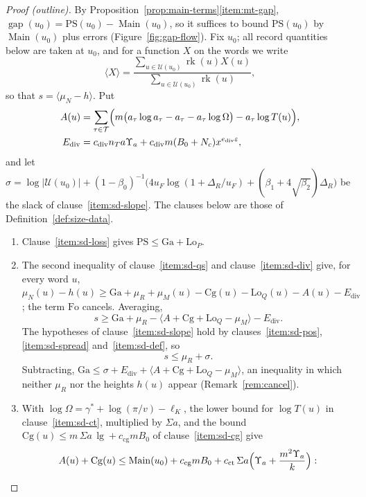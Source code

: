 \documentclass[11pt]{amsbook}
\theoremstyle{plain}
\theoremstyle{definition}
\theoremstyle{remark}
\numberwithin{equation}{section}
\numberwithin{figure}{chapter}
\numberwithin{table}{chapter}
\newcommand{\eps}{\varepsilon}
\newcommand{\rk}{\operatorname{rk}}
\newcommand{\PS}{\mathrm{PS}}
\newcommand{\Top}{\mathcal{T}}
\newcommand{\gap}{\operatorname{gap}}
\newcommand{\Main}{\operatorname{Main}}
\newcommand{\Words}{\mathcal{U}}
\newcommand{\Cg}{\mathrm{Cg}}
\newcommand{\lgv}{\operatorname{lg}}
\newcommand{\Fo}{\mathrm{Fo}}
\newcommand{\Ga}{\mathrm{Ga}}
\newcommand{\Lo}{\mathrm{Lo}}
\begin{document}
\begin{proof}[Proof (outline)]
By Proposition~\ref{prop:main-terms}\ref{item:mt-gap},
$\gap(u_0)=\PS(u_0)-\Main(u_0)$,
so it suffices to bound $\PS(u_0)$ by $\Main(u_0)$ plus errors (Figure~\ref{fig:gap-flow}). Fix
$u_0$; all record quantities below are taken at $u_0$, and for a
function $X$ on the words we write
\[
\langle X\rangle=\frac{\sum_{u\in\Words(u_0)}\rk(u)X(u)}
{\sum_{u\in\Words(u_0)}\rk(u)},
\]
so that $s=\langle\mu_N-h\rangle$. Put
\[
\begin{aligned}
A(u)&=\sum_{\tau\in\Top}\Bigl(m\bigl(a_\tau\log a_\tau
-a_\tau-a_\tau\log\Omega\bigr)-a_\tau\log T(u)\Bigr),\\
E_{\mathrm{div}}&=c_{\mathrm{div}}n_Ta\Upsilon_a+c_{\mathrm{div}}
m(B_0+N_c)x^{e_{\mathrm{div}}\eps},
\end{aligned}
\]
and let $\sigma=\log|\Words(u_0)|+(1-\beta_0)^{-1}\bigl(4u_F\log(1+
\Delta_R/u_F)+(\beta_1+4\sqrt{\beta_2})\Delta_R\bigr)$ be the slack of
clause~\ref{item:sd-slope}. The clauses below are those of
Definition~\ref{def:size-data}.
\begin{enumerate}[label=(\arabic*)]
\item\label{item:gap-s1} Clause~\ref{item:sd-loss} gives $\PS\le\Ga+\Lo_P$.
\item The second inequality of clause~\ref{item:sd-qs} and
clause~\ref{item:sd-div} give, for
every word $u$,
$\mu_N(u)-h(u)\ge\Ga+\mu_R+\mu_M(u)-\Cg(u)-\Lo_Q(u)-A(u)
-E_{\mathrm{div}}$; the term $\Fo$ cancels. Averaging,
\begin{equation}\label{eq:sandwich-lower}
s\ge\Ga+\mu_R-\bigl\langle A+\Cg+\Lo_Q-\mu_M\bigr\rangle
-E_{\mathrm{div}}.
\end{equation}
The hypotheses of clause~\ref{item:sd-slope} hold by clauses~\ref{item:sd-pos},
\ref{item:sd-spread} and~\ref{item:sd-def}, so
\begin{equation}\label{eq:sandwich-upper}
s\le\mu_R+\sigma.
\end{equation}
Subtracting, $\Ga\le\sigma+E_{\mathrm{div}}+\langle A+\Cg+\Lo_Q
-\mu_M\rangle$, an inequality in which neither $\mu_R$ nor the
heights $h(u)$ appear (Remark~\ref{rem:cancel}).
\item\label{item:gap-s3}
With $\log\Omega=\gamma^*+\log(\pi/v)-\ell_K$, the lower bound
for $\log T(u)$ in clause~\ref{item:sd-ct}, multiplied by $\Sigma a$, and the
bound
$\Cg(u)\le m\,\Sigma a\,\lgv+c_{\mathrm{cg}}mB_0$ of clause~\ref{item:sd-cg}
give
\[
A(u)+\Cg(u)\le\Main(u_0)+c_{\mathrm{cg}}mB_0+c_{\mathrm{ct}}\,\Sigma a
\Bigl(\Upsilon_a+\frac{m^2\Upsilon_a}{k}\Bigr):
\]
\end{enumerate}
\end{proof}
\end{document}
